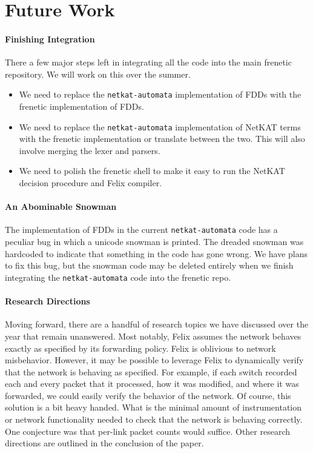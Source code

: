 \documentclass{hw}
\newcommand{\netauto}{\texttt{netkat-automata}}
\begin{document}
\section{Future Work}
\paragraph{Finishing Integration}
There a few major steps left in integrating all the code into the main frenetic
repository. We will work on this over the summer.
\begin{itemize}
  \item
    We need to replace the \netauto{} implementation of FDDs with the frenetic
    implementation of FDDs.
  \item
    We need to replace the \netauto{} implementation of NetKAT terms with the
    frenetic implementation or translate between the two. This will also
    involve merging the lexer and parsers.
  \item
    We need to polish the frenetic shell to make it easy to run the NetKAT
    decision procedure and Felix compiler.
\end{itemize}

\paragraph{An Abominable Snowman}
The implementation of FDDs in the current \netauto{} code has a peculiar bug in
which a unicode snowman is printed. The dreaded snowman was hardcoded to
indicate that something in the code has gone wrong. We have plans to fix this
bug, but the snowman code may be deleted entirely when we finish integrating
the \netauto{} code into the frenetic repo.

\paragraph{Research Directions}
Moving forward, there are a handful of research topics we have discussed over
the year that remain unanswered. Most notably, Felix assumes the network
behaves exactly as specified by its forwarding policy. Felix is oblivious to
network misbehavior. However, it may be possible to leverage Felix to
dynamically verify that the network is behaving as specified. For example, if
each switch recorded each and every packet that it processed, how it was
modified, and where it was forwarded, we could easily verify the behavior of
the network. Of course, this solution is a bit heavy handed. What is the
minimal amount of instrumentation or network functionality needed to check that
the network is behaving correctly. One conjecture was that per-link packet
counts would suffice. Other research directions are outlined in the conclusion
of the paper.
\end{document}
